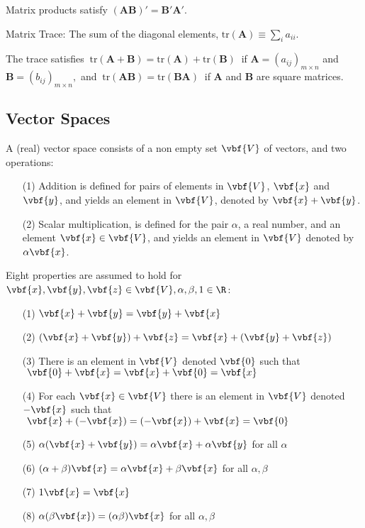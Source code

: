 \bstheo
Matrix products satisfy $\mathbf{(AB)'=B'A'}.$
\estheo 

\bdefi 
Matrix Trace: The sum of the diagonal elements, $\mathrm{tr}(\mathbf
A)\equiv\sum_i a_{ii}.$
\esdefi

\bstheo
The trace satisfies $\ \mathbf{\mathrm{tr}(A + B) = \mathrm{tr}(A) +
\mathrm{tr}(B)}\ $ if $\mathbf{A}=(a_{ij})_{m\times n}$ and
$\mathbf{B}=(b_{ij})_{m\times n},$ and $\ \mathbf{\mathrm{tr}(AB) =
\mathrm{tr}(BA)}\ $ if $\mathbf A$ and $\mathbf B$ are square
matrices.
\etheo



\subsection{Vector Spaces}

\bdefi
A (real) vector space consists of a non empty set $\vbf{V}$ of
vectors, and two operations:
\begin{enumerate}
\item[(1)] 
Addition is defined for pairs of elements in $\vbf{V}$, $\vbf{x}$ and
$\vbf{y}$, and yields an element in $\vbf{V}$, denoted by $\vbf{x} +
\vbf{y}$.
\item[(2)] 
Scalar multiplication, is defined for the pair $\alpha$, a real
number, and an element $\vbf{x} \in \vbf{V}$, and yields an element in
$\vbf{V}$ denoted by $\alpha\vbf{x}$.
\end{enumerate}
Eight properties are assumed to hold for $\vbf{x}, \vbf{y}, \vbf{z}
\in \vbf{V}, \alpha ,\beta, 1 \in \R$:
\begin{enumerate}
\item[(1)] 
$\vbf{x} + \vbf{y} = \vbf{y} + \vbf{x}$
\item[(2)] 
$(\vbf{x} + \vbf{y})+\vbf{z} = \vbf{x}+(\vbf{y} + \vbf{z})$
\item[(3)] 
There is an element in $\vbf{V}$ denoted $\vbf{0}$ such that
$\ \vbf{0} + \vbf{x} = \vbf{x} + \vbf{0} = \vbf{x}$
\item[(4)] 
For each $\vbf{x} \in \vbf{V}$ there is an element in $\vbf{V}$
denoted $-\vbf{x}$ such that
$\ \vbf{x} + (-\vbf{x}) = (-\vbf{x}) + \vbf{x} = \vbf{0}$
\item[(5)] 
$\alpha(\vbf{x} + \vbf{y}) = \alpha\vbf{x}+ \alpha\vbf{y}$ for all
$\alpha$
\item[(6)] 
$(\alpha+\beta)\vbf{x}=\alpha\vbf{x}+\beta\vbf{x}$ for all $\alpha,
\beta$
\item[(7)] 
$ 1\vbf{x} = \vbf{x}$
\item[(8)] 
$\alpha(\beta\vbf{x})=(\alpha\beta)\vbf{x}$ for all $\alpha, \beta$
\end{enumerate}
\esdefi

